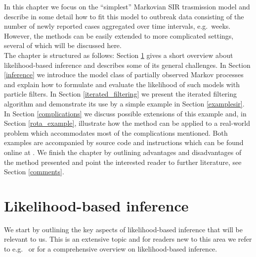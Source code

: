 In this chapter we focus  on the ``simplest'' Markovian SIR trasmission model and  describe in some detail how to fit this model to outbreak data consisting of the number of newly reported cases aggregated over  time intervals, e.g.\ weeks. However, the methods can be easily extended to  more complicated settings, several of which will be discussed here. \\ The chapter is structured as follows:  Section \ref{likelihood} gives a short overview about likelihood-based inference and describes some of its general challenges.  In Section \ref{inference} we introduce the  model class of partially observed Markov processes and  explain how to formulate and evaluate the likelihood of such models with particle filters. In Section \ref{iterated_filtering} we present the iterated filtering algorithm  and  demonstrate its use by a simple example  in Section \ref{examplesir}. In Section \ref{complications} we discuss possible extensions of this example and, in Section \ref{rota_example}, illustrate  how the method can be applied to a real-world problem which accommodates most of the  complications mentioned. Both examples are accompanied by source code and instructions which can be found online at \cite{theresa_git}.  We finish the chapter by outlining  advantages and disadvantages of the method presented and point the interested reader to further literature, see Section \ref{comments}. 
\section{Likelihood-based inference}
\label{likelihood}
We start by outlining the key aspects of likelihood-based inference that will be relevant to us. This is an extensive topic and for readers new to this area we refer to e.g.\  \cite{Pawitan2001} or \cite{held}  for a comprehensive overview on likelihood-based inference. 

